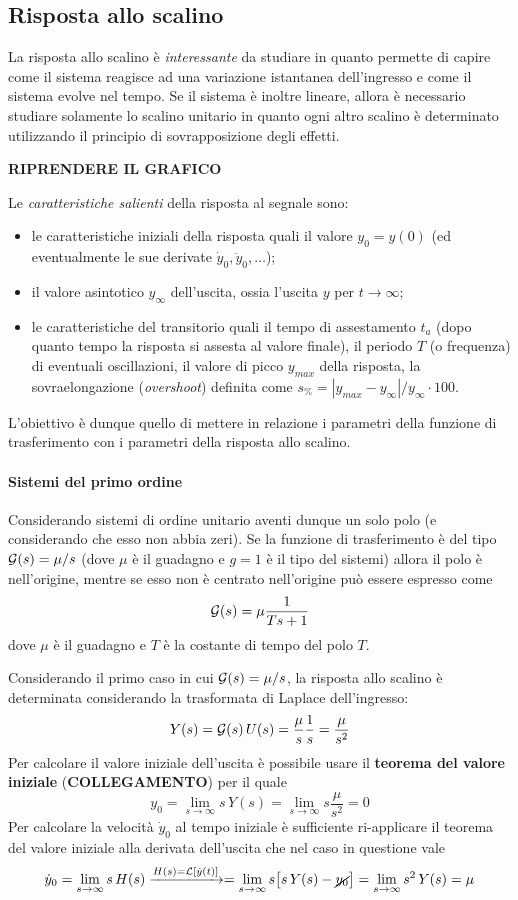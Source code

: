 	\subsection{Risposta allo scalino}
		La risposta allo scalino è \textit{interessante} da studiare in quanto permette di capire come il sistema reagisce ad una variazione istantanea dell'ingresso e come il sistema evolve nel tempo. Se il sistema è inoltre lineare, allora è necessario studiare solamente lo scalino unitario in quanto ogni altro scalino è determinato utilizzando il principio di sovrapposizione degli effetti.
		
		\textbf{RIPRENDERE IL GRAFICO}
		
		Le \textit{caratteristiche salienti} della risposta al segnale sono:
		\begin{itemize}
			\item le caratteristiche iniziali della risposta quali il valore $y_0=y(0)$ (ed eventualmente le sue derivate $\dot y_0,\ddot y_0,\dots$);
			\item il valore asintotico $y_\infty$ dell'uscita, ossia l'uscita $y$ per $t\rightarrow \infty$;
			\item le caratteristiche del transitorio quali il tempo di assestamento $t_a$ (dopo quanto tempo la risposta si assesta al valore finale), il periodo $T$ (o frequenza) di eventuali oscillazioni, il valore di picco $y_{max}$ della risposta, la sovraelongazione (\textit{overshoot}) definita come $s_\% = |y_{max} - y_\infty|/y_\infty \cdot 100$.
		\end{itemize}
		L'obiettivo è dunque quello di mettere in relazione i parametri della funzione di trasferimento con i parametri della risposta allo scalino.
		
		
		\paragraph{Sistemi del primo ordine} Considerando sistemi di ordine unitario aventi dunque un solo polo (e considerando che esso non abbia zeri). Se la funzione di trasferimento è del tipo $\mathcal G(s) = \mu / s$ (dove $\mu$ è il guadagno e $g=1$ è il tipo del sistemi) allora il polo è nell'origine, mentre se esso non è centrato nell'origine può essere espresso come
		\[ \mathcal G(s) = \mu \frac 1 {Ts + 1} \]
		dove $\mu$ è il guadagno e $T$ è la costante di tempo del polo $T$.
		
		Considerando il primo caso in cui $\mathcal G(s) = \mu/s$, la risposta allo scalino è determinata considerando la trasformata di Laplace dell'ingresso:
		\[ Y(s) =  \mathcal G(s)\, U(s) = \frac \mu s \frac 1 s = \frac \mu {s^2}\]
		Per calcolare il valore iniziale dell'uscita è possibile usare il \textbf{teorema del valore iniziale} (\textbf{COLLEGAMENTO}) per il quale 
		\[ y_0 = \lim_{s\rightarrow\infty}s\, Y(s) = \lim_{s\rightarrow \infty} s \frac \mu {s^2} = 0 \]
		Per calcolare la velocità $\dot y_0$ al tempo iniziale è sufficiente ri-applicare il teorema del valore iniziale alla derivata dell'uscita che nel caso in questione vale
		\[ \dot y_0 = \lim_{s\rightarrow \infty} s\, H(s) \xrightarrow{H(s) = \mathcal L [\dot y(t)]} = \lim_{s\rightarrow \infty} s\big[s\, Y(s) -\cancel{y_0}\big] = \lim_{s\rightarrow \infty} s^2 \, Y(s) = \mu \]
		
